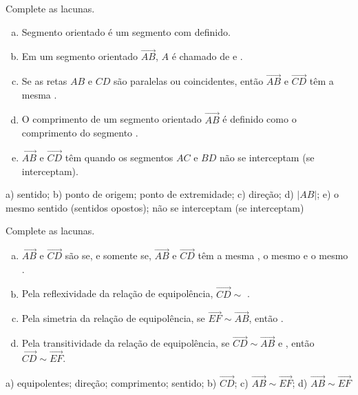 \begin{exer}
  Complete as lacunas.
  \begin{enumerate}[a)]
    \item Segmento orientado é um segmento com \underline{\phantom{sentido}} definido.
    \item Em um segmento orientado $\overrightarrow{AB}$, $A$ é chamado de \underline{\phantom{ponto de origem}} e \underline{\phantom{ponto de extremidade}}.
    \item Se as retas $AB$ e $CD$ são paralelas ou coincidentes, então $\overrightarrow{AB}$ e $\overrightarrow{CD}$ têm a mesma \underline{\phantom{direção}}.
    \item O comprimento de um segmento orientado $\overrightarrow{AB}$ é definido como o comprimento do segmento \underline{\phantom{|AB|}}.
    \item $\overrightarrow{AB}$ e $\overrightarrow{CD}$ têm \underline{\phantom{o mesmo sentido (sentidos opostos)}} quando os segmentos $AC$ e $BD$ não se interceptam (se interceptam).
  \end{enumerate}
\end{exer}
\begin{resp}
  a) sentido; b) ponto de origem; ponto de extremidade;  c) direção; d) $|AB|$; e) o mesmo sentido (sentidos opostos); não se interceptam (se interceptam)
\end{resp}

\begin{exer}
  Complete as lacunas.
  \begin{enumerate}[a)]
    \item $\overrightarrow{AB}$ e $\overrightarrow{CD}$ são \underline{\phantom{equipolentes}} se, e somente se, $\overrightarrow{AB}$ e $\overrightarrow{CD}$ têm a mesma \underline{\phantom{direção}}, o mesmo \underline{\phantom{comprimento}} e o mesmo \underline{\phantom{sentido}}.
    \item Pela reflexividade da relação de equipolência, $\overrightarrow{CD}\sim$ \underline{}.
    \item Pela simetria da relação de equipolência, se $\overrightarrow{EF}\sim\overrightarrow{AB}$, então \underline{}.
    \item Pela transitividade da relação de equipolência, se $\overrightarrow{CD}\sim\overrightarrow{AB}$ e \underline{}, então $\overrightarrow{CD}\sim\overrightarrow{EF}$.
  \end{enumerate}
\end{exer}
\begin{resp}
  a) equipolentes; direção; comprimento; sentido; b) $\overrightarrow{CD}$; c) $\overrightarrow{AB}\sim\overrightarrow{EF}$; d) $\overrightarrow{AB}\sim\overrightarrow{EF}$
\end{resp}


